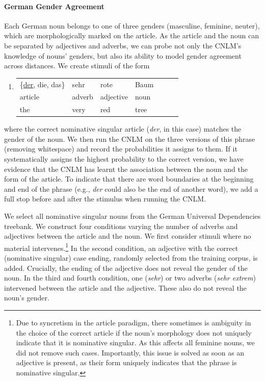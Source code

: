 \paragraph{German Gender Agreement}
Each German noun belongs to one of three genders (masculine, feminine, neuter), which are morphologically marked on the article.
As the article and the noun can be separated by adjectives and adverbs, we can probe not only the CNLM's knowledge of nouns' genders, but also its ability to model gender agreement across distances.
We create stimuli of the form
\begin{enumerate}[label={(\arabic*)}]
	\item \begin{tabular}[t]{lllllll}
	\{\underline{der}, die, das\}& sehr& rote& Baum \\
	article & adverb & adjective & noun \\
	the & very & red & tree
\end{tabular}
\end{enumerate}
where the correct nominative singular article (\emph{der}, in this case) matches the gender of the noun.
We then run the CNLM on the three versions of this phrase (removing whitespace) and record the probabilities it assigns to them.
If it systematically assigns the highest probability to the correct version, we have evidence that the CNLM has learnt the association between the noun and the form of the article.
To indicate that there are word boundaries at the beginning and end of the phrase (e.g., \emph{der} could also be the end of another word), we add a full stop before and after the stimulus when running the CNLM.

We select all nominative singular nouns from the German Universal Dependencies treebank. %
We construct four conditions varying the number of adverbs and adjectives between the article and the noun.
We first consider stimuli where no material intervenes.\footnote{Due to syncretism in the article paradigm, there sometimes is ambiguity in the choice of the correct article if the noun's morphology does not uniquely indicate that it is nominative singular. As this affects all feminine nouns, we did not remove such cases. Importantly, this issue is solved as soon as an adjective is present, as their form uniquely indicates that the phrase is nominative singular.}
In the second condition, an adjective with the correct (nominative singular) case ending, randomly selected from the training corpus, is added.
Crucially, the ending of the adjective does not reveal the gender of the noun.
In the third and fourth condition, one (\emph{sehr}) or two adverbs (\emph{sehr extrem}) intervened between the article and the adjective.
These also do not reveal the noun's gender.

